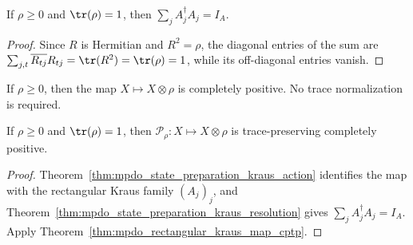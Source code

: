 \begin{theorem}
    \label{thm:mpdo_state_preparation_kraus_resolution}
    \leanok
    If $\rho\geq0$ and $\tr(\rho)=1$, then
    $\sum_j A_j^\dagger A_j=I_A$.
\end{theorem}
\begin{proof}
    \leanok
    Since $R$ is Hermitian and $R^2=\rho$, the diagonal entries of the sum are
    $\sum_{j,t}\overline{R_{tj}}R_{tj}
    =\tr(R^2)=\tr(\rho)=1$, while its off-diagonal entries vanish.
\end{proof}

\begin{lemma}
    \label{lem:mpdo_state_preparation_cp}
    \leanok
    If $\rho\geq0$, then the map $X\mapsto X\otimes\rho$ is completely
    positive. No trace normalization is required.
\end{lemma}

\begin{lemma}
    \label{lem:mpdo_state_preparation_cptp}
    \leanok
    If $\rho\geq0$ and $\tr(\rho)=1$, then
    $\mathcal P_\rho:X\mapsto X\otimes\rho$ is trace-preserving completely
    positive.
\end{lemma}

\begin{proof}
    \leanok
    Theorem~\ref{thm:mpdo_state_preparation_kraus_action} identifies the map
    with the rectangular Kraus family $(A_j)_j$, and
    Theorem~\ref{thm:mpdo_state_preparation_kraus_resolution} gives
    $\sum_j A_j^\dagger A_j=I_A$. Apply
    Theorem~\ref{thm:mpdo_rectangular_kraus_map_cptp}.
\end{proof}
